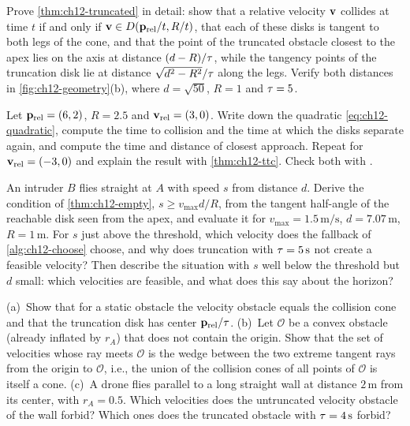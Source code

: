 \begin{exercise}
\label{exr:ch12-truncation}
Prove \cref{thm:ch12-truncated} in detail: show that a relative velocity
$\mathbf{v}$ collides at time $t$ if and only if $\mathbf{v} \in D(\mathbf{p}_{\mathrm{rel}}/t,R/t)$,
that each of these disks is tangent to both legs of the cone, and that the
point of the truncated obstacle closest to the apex lies on the axis at
distance $(d - R)/\tau$, while the tangency points of the truncation disk lie
at distance $\sqrt{d^2 - R^2}/\tau$ along the legs. Verify both distances in
\cref{fig:ch12-geometry}(b), where $d = \sqrt{50}$, $R = 1$ and $\tau = 5$.
\end{exercise}

\begin{exercise}[\difficulty{1}]
\label{exr:ch12-ttc}
Let $\mathbf{p}_{\mathrm{rel}} = (6, 2)$, $R = 2.5$ and $\mathbf{v}_{\mathrm{rel}} = (3, 0)$.
Write down the quadratic \cref{eq:ch12-quadratic}, compute the time to
collision and the time at which the disks separate again, and compute the
time and distance of closest approach. Repeat for $\mathbf{v}_{\mathrm{rel}} = (-3, 0)$
and explain the result with \cref{thm:ch12-ttc}. Check both with
.
\end{exercise}

\begin{exercise}[\difficulty{2}]
\label{exr:ch12-empty}
An intruder $B$ flies straight at $A$ with speed $s$ from distance $d$. Derive
the condition of \cref{thm:ch12-empty}, $s \ge v_{\max} d/R$, from the tangent
half-angle of the reachable disk seen from the apex, and evaluate it for
$v_{\max} = 1.5\,\mathrm{m/s}$, $d = 7.07\,\mathrm{m}$, $R = 1\,\mathrm{m}$. For
$s$ just above the threshold, which velocity does the fallback of
\cref{alg:ch12-choose} choose, and why does truncation with $\tau = 5\,\mathrm{s}$
not create a feasible velocity? Then describe the situation with $s$ well
below the threshold but $d$ small: which velocities are feasible, and what
does this say about the horizon?
\end{exercise}

\begin{exercise}[\difficulty{2}]
\label{exr:ch12-static}
(a)~Show that for a static obstacle the velocity obstacle equals the
collision cone and that the truncation disk has center $\mathbf{p}_{\mathrm{rel}}/\tau$.
(b)~Let $\mathcal{O}$ be a convex obstacle (already inflated by $r_A$) that
does not contain the origin. Show that the set of velocities whose ray meets
$\mathcal{O}$ is the wedge between the two extreme tangent rays from the
origin to $\mathcal{O}$, i.e., the union of the collision cones of all points
of $\mathcal{O}$ is itself a cone. (c)~A drone flies parallel to a long
straight wall at distance $2\,\mathrm{m}$ from its center, with $r_A = 0.5$.
Which velocities does the untruncated velocity obstacle of the wall forbid?
Which ones does the truncated obstacle with $\tau = 4\,\mathrm{s}$ forbid?
\end{exercise}

